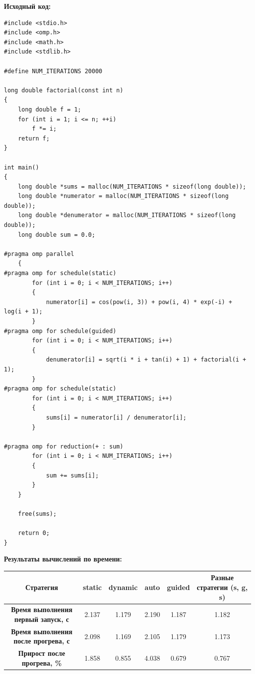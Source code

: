 \documentclass[a4paper,14pt]{extarticle}
\begin{document}
\textbf{Исходный код:}
\begin{verbatim}
#include <stdio.h>
#include <omp.h>
#include <math.h>
#include <stdlib.h>

#define NUM_ITERATIONS 20000

long double factorial(const int n)
{
    long double f = 1;
    for (int i = 1; i <= n; ++i)
        f *= i;
    return f;
}

int main()
{
    long double *sums = malloc(NUM_ITERATIONS * sizeof(long double));
    long double *numerator = malloc(NUM_ITERATIONS * sizeof(long double));
    long double *denumerator = malloc(NUM_ITERATIONS * sizeof(long double));
    long double sum = 0.0;

#pragma omp parallel
    {
#pragma omp for schedule(static)
        for (int i = 0; i < NUM_ITERATIONS; i++)
        {
            numerator[i] = cos(pow(i, 3)) + pow(i, 4) * exp(-i) + log(i + 1);
        }
#pragma omp for schedule(guided)
        for (int i = 0; i < NUM_ITERATIONS; i++)
        {
            denumerator[i] = sqrt(i * i + tan(i) + 1) + factorial(i + 1);
        }
#pragma omp for schedule(static)
        for (int i = 0; i < NUM_ITERATIONS; i++)
        {
            sums[i] = numerator[i] / denumerator[i];
        }

#pragma omp for reduction(+ : sum)
        for (int i = 0; i < NUM_ITERATIONS; i++)
        {
            sum += sums[i];
        }
    }

    free(sums);

    return 0;
}
\end{verbatim}

\textbf{Результаты вычислений по времени:}\\
\begin{tabular}{|c|c|c|c|c|c|}
    \hline
    \textbf{Стратегия}                          & static & dynamic & auto  & guided & Разные стратегии (s, g, s) \\ 
    \hline
    \textbf{Время выполнения первый запуск, с}  & 2.137  & 1.179   & 2.190 & 1.187  & 1.182\\
    \hline
    \textbf{Время выполнения после прогрева, с} & 2.098  & 1.169   & 2.105 & 1.179  & 1.173\\
    \hline
    \textbf{Прирост после прогрева, \%}         & 1.858  & 0.855   & 4.038 & 0.679  & 0.767\\
    \hline
\end{tabular}\\
\end{document}
